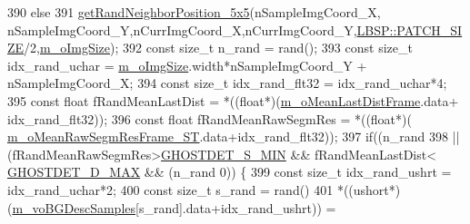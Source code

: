 \begin{DoxyCode}
390                 \textcolor{keywordflow}{else}
391                     \mbox{\hyperlink{_rand_utils_8h_adb1e7788e9dbe8cfde588761e96126c1}{getRandNeighborPosition\_5x5}}(nSampleImgCoord\_X,
      nSampleImgCoord\_Y,nCurrImgCoord\_X,nCurrImgCoord\_Y,\mbox{\hyperlink{class_l_b_s_p_aa98abb79a155d3a2b416c2ab32e74929}{LBSP::PATCH\_SIZE}}/2,\mbox{\hyperlink{class_background_subtractor_l_b_s_p_a732d5e6ae35fb0e858cadb3af5ce08a2}{m\_oImgSize}});
392                 \textcolor{keyword}{const} \textcolor{keywordtype}{size\_t} n\_rand = rand();
393                 \textcolor{keyword}{const} \textcolor{keywordtype}{size\_t} idx\_rand\_uchar = \mbox{\hyperlink{class_background_subtractor_l_b_s_p_a732d5e6ae35fb0e858cadb3af5ce08a2}{m\_oImgSize}}.width*nSampleImgCoord\_Y + 
      nSampleImgCoord\_X;
394                 \textcolor{keyword}{const} \textcolor{keywordtype}{size\_t} idx\_rand\_flt32 = idx\_rand\_uchar*4;
395                 \textcolor{keyword}{const} \textcolor{keywordtype}{float} fRandMeanLastDist = *((\textcolor{keywordtype}{float}*)(\mbox{\hyperlink{class_background_subtractor_su_b_s_e_n_s_e_ad95bb91ff7ef9db725772b37d679e1a2}{m\_oMeanLastDistFrame}}.data+
      idx\_rand\_flt32));
396                 \textcolor{keyword}{const} \textcolor{keywordtype}{float} fRandMeanRawSegmRes = *((\textcolor{keywordtype}{float}*)(
      \mbox{\hyperlink{class_background_subtractor_su_b_s_e_n_s_e_a3c9fd9cf995eb9a7b4006467ab874958}{m\_oMeanRawSegmResFrame\_ST}}.data+idx\_rand\_flt32));
397                 \textcolor{keywordflow}{if}((n\_rand%
398                     || (fRandMeanRawSegmRes>\mbox{\hyperlink{_background_subtractor_su_b_s_e_n_s_e_8cpp_aa6ad1e76fe6a12c04328c5541d44ebcb}{GHOSTDET\_S\_MIN}} && fRandMeanLastDist<
      \mbox{\hyperlink{_background_subtractor_su_b_s_e_n_s_e_8cpp_aa1fa68710898742a17b61ace30b21120}{GHOSTDET\_D\_MAX}} && (n\_rand%
      0)) \{
399                     \textcolor{keyword}{const} \textcolor{keywordtype}{size\_t} idx\_rand\_ushrt = idx\_rand\_uchar*2;
400                     \textcolor{keyword}{const} \textcolor{keywordtype}{size\_t} s\_rand = rand()%
401                     *((ushort*)(\mbox{\hyperlink{class_background_subtractor_su_b_s_e_n_s_e_a422cc2f2a25c07efca02087bd6fe3d6d}{m\_voBGDescSamples}}[s\_rand].data+idx\_rand\_ushrt)) = 

\end{DoxyCode}
